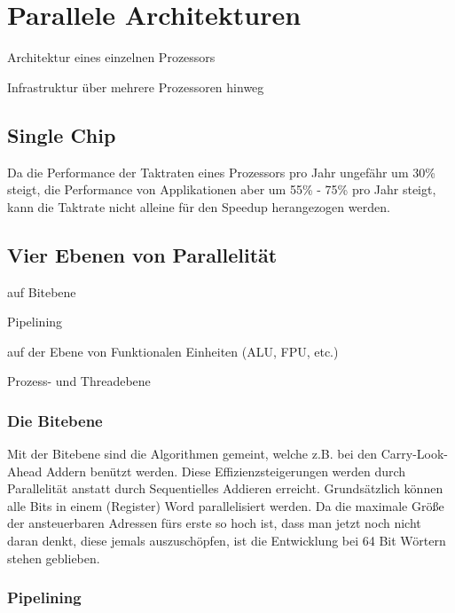 \section{Parallele Architekturen}

\begin{compactitem}
\item Architektur eines einzelnen Prozessors
\item Infrastruktur über mehrere Prozessoren hinweg
\end{compactitem}

\subsection{Single Chip}

Da die Performance der Taktraten eines Prozessors pro Jahr ungefähr um 30\%
steigt, die Performance von Applikationen aber um 55\% - 75\% pro Jahr steigt,
kann die Taktrate nicht alleine für den Speedup herangezogen werden.

\subsection{Vier Ebenen von Parallelität}

\begin{compactitem}
\item auf Bitebene
\item Pipelining
\item auf der Ebene von Funktionalen Einheiten (ALU, FPU, etc.)
\item Prozess- und Threadebene
\end{compactitem}

\subsubsection{Die Bitebene}

Mit der Bitebene sind die Algorithmen gemeint, welche z.B. bei den Carry-Look-Ahead
Addern benützt werden. Diese Effizienzsteigerungen werden durch Parallelität anstatt
durch Sequentielles Addieren erreicht. Grundsätzlich können alle Bits in einem 
(Register) Word parallelisiert werden. Da die maximale Größe der ansteuerbaren
Adressen fürs erste so hoch ist, dass man jetzt noch nicht daran denkt, diese
jemals auszuschöpfen, ist die Entwicklung bei 64 Bit Wörtern stehen geblieben.

\subsubsection{Pipelining}

